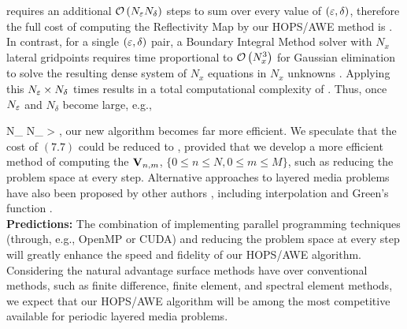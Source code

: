 requires an additional $\mathcal{O} \left( N_{\varepsilon} N_{\delta} \right)$ steps to sum 
over every value of $(\varepsilon,\delta)$, therefore the full cost of 
computing the Reflectivity Map by our HOPS/AWE method is
\be
{}.
\ee
In contrast, for a single $(\varepsilon,\delta)$ pair, a Boundary Integral Method solver with $N_x$ lateral
gridpoints requires time proportional to $\mathcal{O} \left( N_x^3 \right)$ for Gaussian elimination
to solve the resulting dense system of $N_x$ equations in $N_x$ unknowns
\cite{BurdenFaires,AtkinsonHan01,ColtonKress13}. Applying this 
$N_{\varepsilon} \times N_{\delta}$ times results in a total computational complexity of
\be
{}.
\ee
Thus, once $N_{\varepsilon}$ and $N_{\delta}$ become large, e.g.,

\bes
N_{\Eps} N_{\delta} > ,
\ees
our new algorithm becomes far more efficient. We speculate that the cost of $(7.7)$ could be reduced to
\be
{},
\ee
provided that we develop a more efficient method of computing the $\mathbf{V}_{n,m}$, 
$\{ 0 \leq n \leq N, 0 \leq m \leq M \}$, such as reducing the problem space at every step. Alternative approaches to layered media problems have also been proposed by other authors \cite{bai2004reduction,chew2005fast}, including interpolation \cite{atkins2010fast} and Green's function \cite{konno2016fast}.
\newline
\\
\textbf{Predictions:} The combination of implementing parallel programming techniques (through, e.g., OpenMP or CUDA) and reducing the problem space at every step will greatly enhance the speed and fidelity of our HOPS/AWE algorithm. Considering the natural advantage surface methods have over conventional methods, such as finite difference, finite element, and spectral element methods, we expect that our HOPS/AWE algorithm will be among the most competitive available for periodic layered media problems.